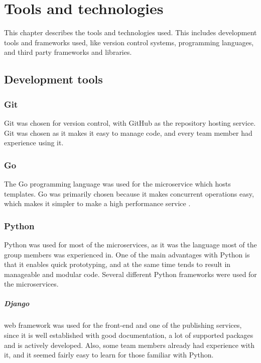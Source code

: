 \chapter{Tools and technologies}
\label{chapterToolsTech}\label{chap:tools_technologies}

This chapter describes the tools and technologies used. This includes development tools and frameworks used, like version control systems, programming languages, and third party frameworks and libraries.


\section{Development tools}

\subsection{Git}
\label{subsection:git}
Git was chosen for version control, with GitHub as the repository hosting service. Git was chosen as it makes it easy to manage code, and every team member had experience using it.

\subsection{Go}
The Go programming language was used for the microservice which hosts templates. Go was primarily chosen because it makes concurrent operations easy, which makes it simpler to make a high performance service \citep{whyGo}. 

\subsection{Python}
Python was used for most of the microservices, as it was the language most of the group members was experienced in. One of the main advantages with Python is that it enables quick prototyping, and at the same time tends to result in manageable and modular code. Several different Python frameworks were used for the microservices. 

\paragraph{Django} web framework was used for the front-end and one of the publishing services, since it is well established with good documentation, a lot of supported packages and is actively developed. Also, some team members already had experience with it, and it seemed fairly easy to learn for those familiar with Python.


